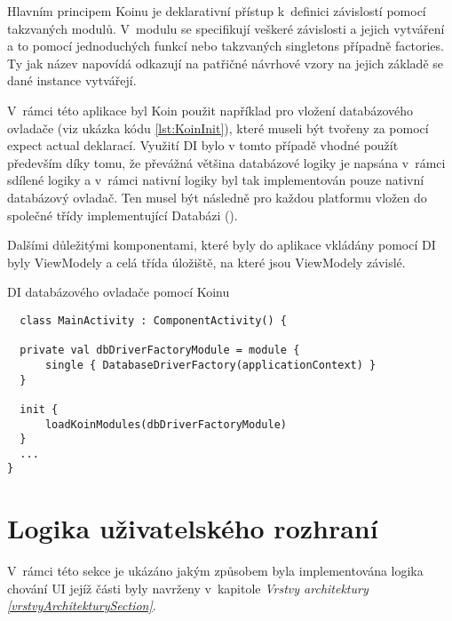 \medskip

Hlavním principem Koinu je deklarativní přístup k~definici závislostí pomocí takzvaných modulů. V~modulu se specifikují veškeré závislosti a 
jejich vytváření a to pomocí jednoduchých funkcí nebo takzvaných singletons případně factories. Ty jak název napovídá odkazují na 
patřičné návrhové vzory na jejich základě se dané instance vytvářejí.

\bigskip

V~rámci této aplikace byl Koin použit například pro vložení databázového ovladače (viz ukázka kódu \ref{lst:KoinInit}), které museli být tvořeny za pomocí expect 
actual deklarací.
Využití DI bylo v tomto případě vhodné použít především díky tomu, že převážná většina databázové logiky je napsána v~rámci sdílené 
logiky a v~rámci nativní logiky byl tak implementován pouze nativní databázový ovladač. Ten musel být následně pro každou platformu vložen do 
společné třídy implementující Databázi ().

Dalšími důležitými komponentami, které byly do aplikace vkládány pomocí DI byly ViewModely a celá třída úložiště, na které jsou ViewModely
závislé.

\begin{listing}[H]
\caption{DI databázového ovladače pomocí Koinu}\label{lst:KoinInit}
\begin{verbatim}
  class MainActivity : ComponentActivity() {

  private val dbDriverFactoryModule = module {
      single { DatabaseDriverFactory(applicationContext) }
  }

  init {
      loadKoinModules(dbDriverFactoryModule)
  }
  ...
}
\end{verbatim}
\end{listing}





\section{Logika uživatelského rozhraní} \label{UILayerImpl}
V~rámci této sekce je ukázáno jakým způsobem byla implementována logika chování UI jejíž části byly navrženy v~kapitole 
\textit{Vrstvy architektury \ref{vrstvyArchitekturySection}}. 


